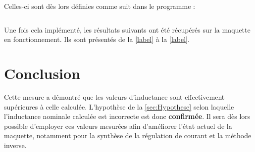 Celles-ci sont dès lors définies comme suit dans le programme :

\begin{verbatim}

\end{verbatim}

Une fois cela implémenté, les résultats suivants ont été récupérés sur la maquette en fonctionnement. Ils sont présentés de la \autoref{label} à la \autoref{label}.

\section{Conclusion}
Cette mesure a démontré que les valeurs d'inductance sont effectivement supérieures à celle calculée. L'hypothèse de la \autoref{sec:Hypothese} selon laquelle l'inductance nominale calculée est incorrecte est donc \textbf{confirmée}. Il sera dès lors possible d'employer ces valeurs mesurées afin d'améliorer l'état actuel de la maquette, notamment pour la synthèse de la régulation de courant et la méthode inverse.